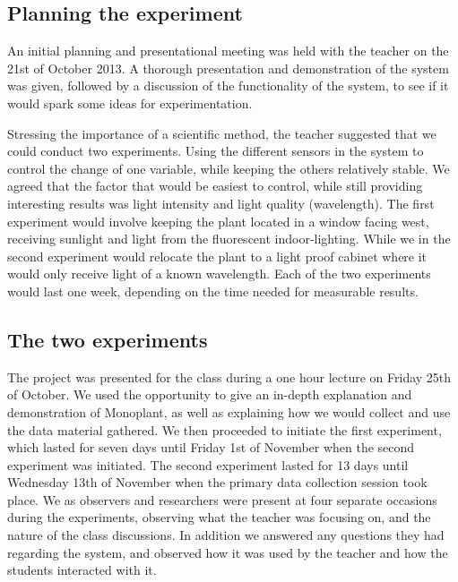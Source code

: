 \subsection{Planning the experiment}
An initial planning and presentational meeting was held with the teacher on the 21st of October 2013. A thorough presentation and demonstration of the system was given, followed by a discussion of the functionality of the system, to see if it would spark some ideas for experimentation. 

Stressing the importance of a scientific method, the teacher suggested that we could conduct two experiments. Using the different sensors in the system to control the change of one variable, while keeping the others relatively stable. We agreed that the factor that would be easiest to control, while still providing interesting results was light intensity and light quality (wavelength). The first experiment would involve keeping the plant located in a window facing west, receiving sunlight and light from the fluorescent indoor-lighting. While we in the second experiment would relocate the plant to a light proof cabinet where it would only receive light of a known wavelength. Each of the two experiments would last one week, depending on the time needed for measurable results.

\subsection{The two experiments}
The project was presented for the class during a one hour lecture on Friday 25th of October. We used the opportunity to give an in-depth explanation and demonstration of Monoplant, as well as explaining how we would collect and use the data material gathered. We then proceeded to initiate the first experiment, which lasted for seven days until Friday 1st of November when the second experiment was initiated. The second experiment lasted for 13 days until Wednesday 13th of November when the primary data collection session took place. We as observers and researchers were present at four separate occasions during the experiments, observing what the teacher was focusing on, and the nature of the class discussions. In addition we answered any questions they had regarding the system, and observed how it was used by the teacher and how the students interacted with it. 

